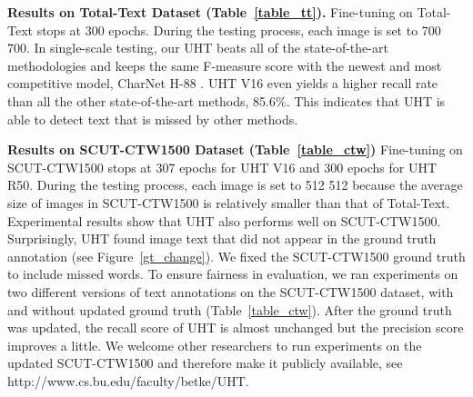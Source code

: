 \documentclass[10pt,twocolumn,letterpaper]{article}
\begin{document}
\textbf{Results on Total-Text Dataset (Table~\ref{table_tt}).} Fine-tuning on Total-Text stops at 300 epochs. During the testing process, each image is set to 700  700. In single-scale testing, our UHT beats all of the state-of-the-art methodologies and keeps the same F-measure score with the newest and most competitive model, CharNet H-88 \cite{charnet}. 
UHT V16 even yields a higher recall rate than all the other state-of-the-art methods, 85.6\%. This indicates that UHT is able to detect text that is missed by other methods.



\textbf{Results on SCUT-CTW1500 Dataset (Table~\ref{table_ctw})} Fine-tuning on SCUT-CTW1500 stops at 307 epochs for UHT V16 and 300 epochs for UHT R50. During the testing process, each image is set to 512  512 because the average size of images in SCUT-CTW1500 is relatively smaller than that of Total-Text. 
Experimental results show that UHT also performs well on SCUT-CTW1500. Surprisingly, UHT found image text that did not appear in the ground truth annotation (see Figure~\ref{gt_change}). We fixed the SCUT-CTW1500 ground truth to include missed words.  To ensure fairness in evaluation, we ran experiments on two different versions of text annotations on the SCUT-CTW1500 dataset, with and without updated ground truth (Table~\ref{table_ctw}). After the ground truth was updated, the recall score of UHT is almost unchanged but the precision score improves a little. We welcome other researchers to run experiments on the updated SCUT-CTW1500 and therefore make it publicly available, see http://www.cs.bu.edu/faculty/betke/UHT.
\end{document}
